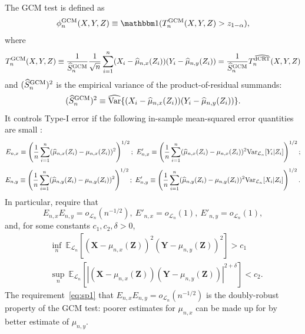 \documentclass[12pt]{article}
\theoremstyle{definition}
\theoremstyle{remark}
\newcommand{\E}{\mathbb E}								%
\newcommand{\V}{\mathrm{Var}}							%
\newcommand{\indicator}{\mathbbm 1}						%
\newcommand{\prx}{\bm X}								%
\newcommand{\srx}{X}									%
\newcommand{\prz}{\bm Z}								%
\newcommand{\srz}{Z}									%
\newcommand{\pry}{{\bm Y}}								%
\newcommand{\sry}{Y}									%
\newcommand{\law}{\mathcal L}							%
\newcommand{\GCM}{\textnormal{GCM}}						%
\newcommand{\dCRThat}{\widehat{\textnormal{dCRT}}}		%
\begin{document}
	The GCM test is defined as
	\begin{equation}
		\phi_n^{\GCM}(\srx, \sry, \srz) \equiv \indicator(T_n^{\GCM}(\srx, \sry, \srz) > z_{1-\alpha}),
		\label{eq:gcm-test}
	\end{equation}
	where
	\begin{equation}
		T_n^{\GCM}(\srx, \sry, \srz) \equiv \frac{1}{\widehat S_{n}^{\GCM}}\frac{1}{\sqrt{n}}\sum_{i = 1}^n (\srx_i - \widehat \mu_{n,x}(\srz_i))(\sry_i - \widehat \mu_{n,y}(\srz_i)) = \frac{1}{\widehat S_{n}^{\GCM}}T_n^{\dCRThat}(\srx, \sry, \srz)
	\end{equation}
	and $(\widehat S_{n}^{\GCM})^2$ is the empirical variance of the product-of-residual summands:
	\begin{equation}
		(\widehat S_{n}^{\GCM})^2 \equiv \widehat{\V}\{(\srx_i - \widehat \mu_{n,x}(\srz_i))(\sry_i - \widehat \mu_{n,y}(\srz_i))\}.
	\end{equation}
	It controls Type-I error if the following in-sample mean-squared error quantities are small \citep{Shah2018}:
	\small
	\begin{equation*}
		E_{n, x} \equiv \left(\frac{1}{n}\sum_{i = 1}^n (\widehat \mu_{n,x}(\srz_i) -  \mu_{n,x}(\srz_i))^2\right)^{1/2};\ E'_{n, x} \equiv \left(\frac{1}{n}\sum_{i = 1}^n (\widehat \mu_{n,x}(\srz_i) -  \mu_{n,x}(\srz_i))^2\textnormal{Var}_{\law_n}[\sry_i|\srz_i]\right)^{1/2};
	\end{equation*}	
	\begin{equation*}
		E_{n, y} \equiv \left(\frac{1}{n}\sum_{i = 1}^n (\widehat \mu_{n,y}(\srz_i) -  \mu_{n,y}(\srz_i))^2\right)^{1/2};\ E'_{n, y} \equiv \left(\frac{1}{n}\sum_{i = 1}^n (\widehat \mu_{n,y}(\srz_i) -  \mu_{n,y}(\srz_i))^2\textnormal{Var}_{\law_n}[\srx_i|\srz_i]\right)^{1/2}.
	\end{equation*}
	\normalsize
	In particular, \citet{Shah2018} require that
	\begin{equation}
		E_{n, x} E_{n, y}  = o_{\law_n}(n^{-1/2}),\  E'_{n, x} = o_{\law_n}(1),\  E'_{n, y} = o_{\law_n}(1)
		\label{eq:sp1}, \tag{SP1}
	\end{equation}
	and, for some constants $c_1, c_2, \delta > 0$,
	\begin{equation}
		\begin{split}
			&\inf_n\ \E_{\law_n}[(\prx-\mu_{n,x}(\prz))^2(\pry-\mu_{n,y}(\prz))^2] > c_1\\
			&\sup_n\ \E_{\law_n}[|(\prx-\mu_{n,x}(\prz))(\pry-\mu_{n,y}(\prz))|^{2+\delta}] < c_2.
			\label{eq:sp2}
		\end{split}
		\tag{SP2}
	\end{equation}
	The requirement~\eqref{eq:sp1} that $E_{n, x} E_{n, y}  = o_{\law_n}(n^{-1/2})$ is the doubly-robust property of the GCM test: poorer estimates for $\mu_{n,x}$ can be made up for by better estimate of $\mu_{n,y}$.
	
\end{document}
